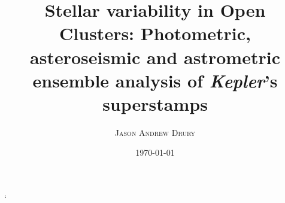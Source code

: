 \documentclass[a4paper,twoside,12pt,varwidth]{book}
\makeatletter
\def\cleardoublepage{\clearpage\if@twoside \ifodd\c@page\else
	\hbox{}
	\vspace*{\fill}
	\thispagestyle{empty}
	\newpage
	\if@twocolumn\hbox{}\newpage\fi\fi\fi}
\makeatother
\begin{document}
\author{\textsc{Jason Andrew Drury}}
\title{Stellar variability in Open Clusters: Photometric, asteroseismic and astrometric ensemble analysis of {\it Kepler}'s superstamps}
\date{\textsc{\today}}
\maketitle






\renewcommand{\contentsname}{\textsc{Table of Contents}}
\tableofcontents
\renewcommand{\listfigurename}{\textsc{List of Figures}}
\listoffigures
\renewcommand{\listtablename}{\textsc{List of Tables}}
\listoftables







%
%
%
%
%
%
%
% 
% 
`

\end{document}
